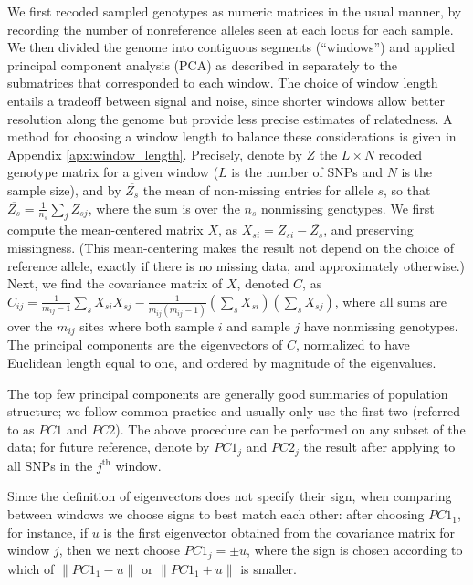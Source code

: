 \documentclass[11pt, oneside]{article}   	%
\newcommand{\pcone}{PC1}
\newcommand{\pctwo}{PC2}
\begin{document}
We first recoded sampled genotypes as numeric matrices in the usual manner,
by recording the number of nonreference alleles seen at each locus for each sample.
We then divided the genome into contiguous segments 
(``windows'')
and applied principal component analysis (PCA) as described in \citet{mcvean2009genealogical}
separately to the submatrices that corresponded to each window.
The choice of window length entails a tradeoff between signal and noise,
since shorter windows allow better resolution along the genome but provide less precise estimates of relatedness.
A method for choosing a window length to balance these considerations is given in Appendix \ref{apx:window_length}.
Precisely,
denote by $Z$ the $L\times N$ recoded genotype matrix for a given window ($L$ is the number of SNPs and $N$ is the sample size), 
and by $\overline{Z_{s}}$ the mean of non-missing entries for allele $s$, 
so that $\overline{Z_{s}}=\frac{1}{n_s}\sum_j Z_{sj}$, 
where the sum is over the $n_s$ nonmissing genotypes.
We first compute the mean-centered matrix $X$, as $X_{si}=Z_{si}-\overline{Z_{s}}$,
and preserving missingness.
(This mean-centering makes the result not depend on the choice of reference allele,
exactly if there is no missing data, and approximately otherwise.)
Next, we find the covariance matrix of $X$, denoted $C$,
as $C_{ij} = \frac{1}{m_{ij}-1} \sum_s X_{si} X_{sj} - \frac{1}{m_{ij}(m_{ij}-1)} (\sum_s X_{si})(\sum_s X_{sj})$,
where all sums are over the $m_{ij}$ sites where both sample $i$ and sample $j$ have nonmissing genotypes.
The principal components are the eigenvectors of $C$, 
normalized to have Euclidean length equal to one,
and ordered by magnitude of the eigenvalues.

The top few principal components are generally good summaries of population structure; 
we follow common practice and usually only use the first two (referred to as $\pcone$ and $\pctwo$).
The above procedure can be performed on any subset of the data;
for future reference, denote by $\pcone_j$ and $\pctwo_j$
the result after applying to all SNPs in the $j^\text{th}$ window.

Since the definition of eigenvectors does not specify their sign,
when comparing between windows we choose signs to best match each other:
after choosing $\pcone_1$, for instance, 
if $u$ is the first eigenvector obtained from the covariance matrix
for window $j$,
then we next choose $\pcone_j = \pm u$,
where the sign is chosen according to which of 
$\| \pcone_{1} - u \|$ or
$\| \pcone_{1} + u \|$ 
is smaller.
\end{document}
